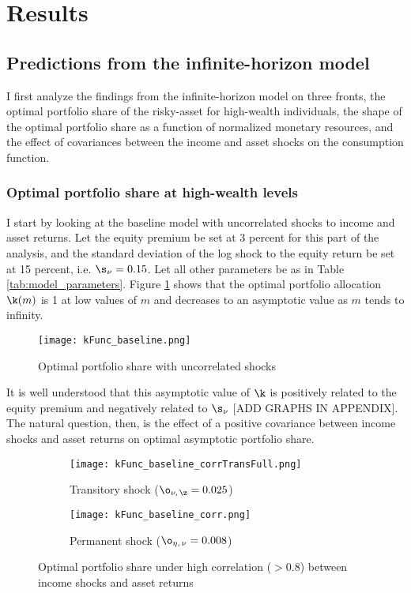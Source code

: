 \section{Results}

\subsection{Predictions from the infinite-horizon model}

I first analyze the findings from the infinite-horizon model on three fronts, the optimal portfolio share of the risky-asset for high-wealth individuals, the shape of the optimal portfolio share as a function of normalized monetary resources, and the effect of covariances between the income and asset shocks on the consumption function.

\subsubsection{Optimal portfolio share at high-wealth levels}

I start by looking at the baseline model with uncorrelated shocks to income and asset returns. Let the equity premium be set at 3 percent for this part of the analysis, and the standard deviation of the log shock to the equity return be set at 15 percent, i.e. $\s_{\nu} = 0.15$. Let all other parameters be as in Table \ref{tab:model_parameters}. Figure \ref{fig:baseline_portfolio} shows that the optimal portfolio allocation $\k(m)$ is 1 at low values of $m$ and decreases to an asymptotic value as $m$ tends to infinity.

\begin{figure}[h]
    \centering
    \texttt{[image: kFunc\_baseline.png]}
    \caption{Optimal portfolio share with uncorrelated shocks}
    \label{fig:baseline_portfolio}
\end{figure}

It is well understood that this asymptotic value of $\k$ is positively related to the equity premium and negatively related to $\s_{\nu}$ [ADD GRAPHS IN APPENDIX]. The natural question, then, is the effect of a positive covariance between income shocks and asset returns on optimal asymptotic portfolio share.

\begin{figure}[h]
    \centering
    \begin{subfigure}{0.49\textwidth}
        \centering
        \texttt{[image: kFunc\_baseline\_corrTransFull.png]}
        \caption{Transitory shock ($\o_{\nu,\,\z} = 0.025$)}
        \label{subfig:correlated_baseline_transitory}
    \end{subfigure}
    \begin{subfigure}{0.49\textwidth}
        \centering
        \texttt{[image: kFunc\_baseline\_corr.png]}
        \caption{Permanent shock ($\o_{\eta,\,\nu} = 0.008$)}
        \label{subfig:correlated_baseline_permanent}
    \end{subfigure}
    \caption{Optimal portfolio share under high correlation ($> 0.8$) between income shocks and asset returns}
    \label{fig:correlated_shock_baseline}
\end{figure}

